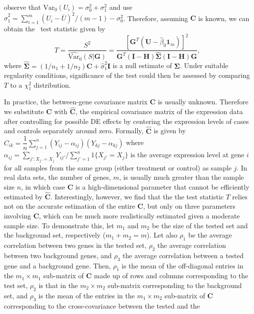 	observe
	that $\mbox{Var}_{0}(U_i)=\sigma_0^2+\sigma_1^2$ and use
	$\hat\sigma_1^2=\sum_{i=1}^m(U_i-\overline{U})^2/(m-1)-\sigma_0^2$. Therefore, assuming $\bm C$ 
	is
	known, we can obtain the \OurMethod~test statistic given by
	\begin{equation}\label{eq:meqleastat}
	T = \dfrac{S^2}{\widehat{\mbox{Var}}_{0}(S|\bm G)} = \dfrac{[\bm G^T(\bm U-\hat\beta_0\bm
		1_m)]^2}{\bm G^T(\bm I-\bm H)\hat{\bm\Sigma}(\bm I-\bm H)\bm G}, 
	\end{equation}
	where $\hat{\bm\Sigma}=(1/n_1+1/n_2)\bm C+\hat\sigma_1^2\bm I$ is a null estimate of $\bm 
	\Sigma$. Under suitable regularity conditions, significance of the test could then be assessed 
	by comparing $T$ to a $\chi^2_1$ distribution.
	
	
	In practice, the between-gene covariance matrix $\bm C$ is usually unknown. Therefore we 
	substitute $\bm C$ with $\hat {\bm C}$, the empirical covariance matrix of the expression data 
	after controlling for
	possible DE effects by centering the expression levels of cases and controls separately around
	zero. Formally, $\hat {\bm C}$ is given by $\hat
	C_{ik}=\dfrac{1}{n}\sum_{j=1}^n(Y_{ij}-\alpha_{ij})(Y_{kj}-\alpha_{kj})$ where
	$\alpha_{ij}=\sum_{j':X_{j'}=X_{j}}Y_{ij'}/\sum_{j'=1}^n1\{X_{j'}=X_{j}\}$ is the average 
	expression level at gene $i$ for all samples from the same group (either treatment or control) 
	as sample $j$. In real data sets, the number of genes, $m$, is usually much greater than the 
	sample size $n$, in
	which case $\bm C$ is a high-dimensional parameter that cannot be efficiently estimated by $\hat
	{\bm C}$. Interestingly, however, we find that the the test statistic $T$ relies not on
	the accurate estimation of the entire $\bm C$, but only on three parameters involving $\bm C$, 
	which can be much more realistically estimated given a moderate sample size. To demonstrate 
	this, let $m_1$ and $m_2$ be the size of the tested set and the background set, respectively 
	($m_1+m_2=m$). Let also $\rho_1$ be the average correlation between two genes in the tested 
	set, $\rho_2$  the average correlation between two background genes, and $\rho_3$ the 
	average 
	correlation between a tested gene and a background gene. Then, $\rho_1$ is the mean of the 
	off-diagonal entries in the $m_1\times m_1$ sub-matrix of $\bm C$ made up of rows and columns 
	corresponding to the test set, $\rho_2$ is that in the $m_2\times m_2$ sub-matrix corresponding 
	to the background set, and $\rho_3$ is the mean of the entries in the $m_1\times m_2$ 
	sub-matrix of $\bm C$ corresponding to the cross-covariance between the tested and the 
